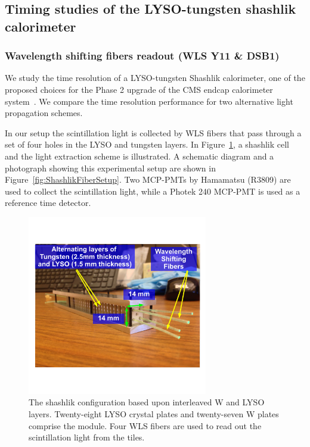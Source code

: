 \subsection{Timing studies of the LYSO-tungsten shashlik calorimeter}
\subsubsection{Wavelength shifting fibers readout (WLS Y11 \& DSB1)}
We study the time resolution of a LYSO-tungsten Shashlik calorimeter, one of the
proposed choices for the Phase 2 upgrade of the CMS endcap calorimeter
system~\cite{Contardo:1605208}. We compare the time resolution performance for
two alternative light propagation schemes. 

In our setup the scintillation light is collected by WLS fibers that
pass through a set of four holes in the LYSO and tungsten layers. In 
Figure~\ref{fig:ShashlikDiagram}, a shashlik cell and the light extraction 
scheme is illustrated. A schematic diagram and a photograph showing this experimental
setup are shown in Figure~\ref{fig:ShashlikFiberSetup}. Two MCP-PMTs  by 
Hamamatsu (R3809) are used to collect the scintillation light, while a Photek 240 
MCP-PMT is used as a reference time detector. 

\begin{figure}[H] \centering
\includegraphics[width=0.7\textwidth]{figs/timing/ShashlikCellPhoto.pdf} 
\caption{ The shashlik configuration based upon interleaved W and LYSO layers. 
Twenty-eight LYSO crystal plates and twenty-seven W plates comprise the module.
Four WLS fibers are used to read out the scintillation light from the 
tiles. } 
\label{fig:ShashlikDiagram}
\end{figure}

